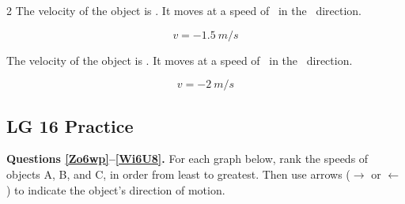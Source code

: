 \documentclass[]{exam}
\begin{document}
\begin{questions}
\begin{multicols}{2}
\question
The velocity of the object is \fillin[][4em]. It moves at a speed of \fillin[][4em]\ in the \fillin[][4.5cm]\ direction.


\begin{solution}

\begin{equation*}
    v = \SI{-1.5}{m/s}
\end{equation*}
\end{solution}

\question \label{CaDSA}
The velocity of the object is \fillin[][4em]. It moves at a speed of \fillin[][4em]\ in the \fillin[][4.5cm]\ direction.


\begin{solution}

\begin{equation*}
    v = \SI{-2}{m/s}
\end{equation*}
\end{solution}

\end{multicols}
\end{questions}

\clearpage

\subsection*{LG 16 Practice}

\textbf{Questions \ref{Zo6wp}--\ref{Wi6U8}.} For each graph below, rank  the speeds of objects A, B, and C, in order from least to greatest. Then use arrows ($\rightarrow$ or $\leftarrow$) to indicate the object's direction of motion.
\end{document}
